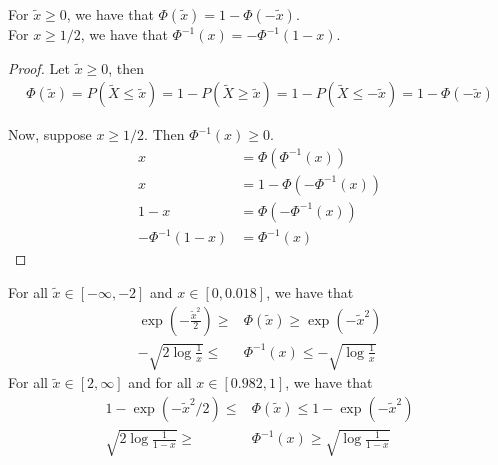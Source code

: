 \documentclass{article}
\begin{document}
\begin{lemma}
For $\tilde{x} \geq 0$, we have that $ \Phi(\tilde{x}) = 1 - \Phi(-\tilde{x})$.\\

For $x \geq 1/2$, we have that $\Phi^{-1}(x) = - \Phi^{-1}(1- x)$. 
\end{lemma}

\begin{proof}
Let $\tilde{x} \geq 0$, then 
\begin{align*}
\Phi(\tilde{x}) = P(\tilde{X} \leq \tilde{x}) = 1 - P(\tilde{X} \geq \tilde{x}) = 1 - P(\tilde{X} \leq - \tilde{x}) = 1 - \Phi(-\tilde{x}) 
\end{align*}

Now, suppose $x \geq 1/2$. Then $\Phi^{-1}(x) \geq 0$.
\begin{align*}
x &= \Phi( \Phi^{-1}(x) ) \\
x &= 1 - \Phi( - \Phi^{-1}(x)) \\
1 - x &= \Phi( - \Phi^{-1}(x)) \\
- \Phi^{-1}(1-x) &= \Phi^{-1}(x)
\end{align*}

\end{proof}

\begin{lemma}

For all $\tilde{x} \in [-\infty, -2]$ and $x \in [0, 0.018]$, we have that
\begin{align*}
\exp(-\frac{\tilde{x}^2}{2} ) \geq & \Phi(\tilde{x}) \geq \exp( - \tilde{x}^2) \\
-\sqrt{2 \log \frac{1}{x} } \leq & \Phi^{-1}(x) \leq -\sqrt{ \log \frac{1}{x} } 
\end{align*}
For all $\tilde{x} \in [2, \infty]$ and for all $x \in [0.982, 1]$, we have that
\begin{align*}
1 - \exp(-\tilde{x}^2/2) \leq & \Phi(\tilde{x}) \leq 1 - \exp(-\tilde{x}^2) \\
\sqrt{ 2 \log \frac{1}{1-x}} \geq & \Phi^{-1}(x) \geq \sqrt{ \log \frac{1}{1-x} } 
\end{align*}

\end{lemma}
\end{document}
